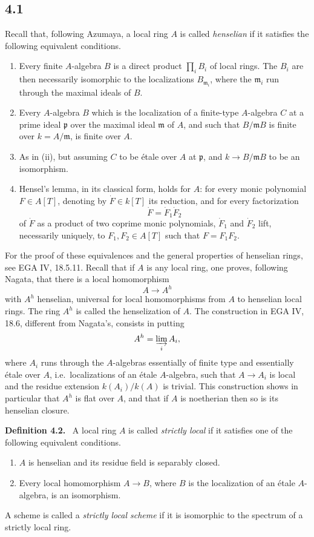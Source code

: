 \documentclass[11pt]{article}
\newcommand{\ie}{i.e.\ }
\newcommand{\EGA}{EGA}
\newenvironment{statement}[1]{\par\medskip\noindent\textbf{#1.}\ }{\par\medskip}
\begin{document}
\subsection*{4.1}
Recall that, following Azumaya, a local ring \(A\) is called \emph{henselian} if it satisfies the following equivalent conditions.
\begin{enumerate}[label=(\roman*)]
\item Every finite \(A\)-algebra \(B\) is a direct product \(\prod_i B_i\) of local rings. The \(B_i\) are then necessarily isomorphic to the localizations \(B_{\mathfrak m_i}\), where the \(\mathfrak m_i\) run through the maximal ideals of \(B\).
\item Every \(A\)-algebra \(B\) which is the localization of a finite-type \(A\)-algebra \(C\) at a prime ideal \(\mathfrak p\) over the maximal ideal \(\mathfrak m\) of \(A\), and such that \(B/\mathfrak mB\) is finite over \(k=A/\mathfrak m\), is finite over \(A\).
\item As in (ii), but assuming \(C\) to be \'etale over \(A\) at \(\mathfrak p\), and \(k\to B/\mathfrak mB\) to be an isomorphism.
\item Hensel's lemma, in its classical form, holds for \(A\): for every monic polynomial \(F\in A[T]\), denoting by \(\dot F\in k[T]\) its reduction, and for every factorization
\[
\dot F=\dot F_1\dot F_2
\]
of \(\dot F\) as a product of two coprime monic polynomials, \(\dot F_1\) and \(\dot F_2\) lift, necessarily uniquely, to \(F_1,F_2\in A[T]\) such that \(F=F_1F_2\).
\end{enumerate}
For the proof of these equivalences and the general properties of henselian rings, see \EGA{} IV, 18.5.11. Recall that if \(A\) is any local ring, one proves, following Nagata, that there is a local homomorphism
\[
A\longrightarrow A^h
\]
with \(A^h\) henselian, universal for local homomorphisms from \(A\) to henselian local rings. The ring \(A^h\) is called the henselization of \(A\). The construction in \EGA{} IV, 18.6, different from Nagata's, consists in putting
\[
A^h=\varinjlim_i A_i,
\]
where \(A_i\) runs through the \(A\)-algebras essentially of finite type and essentially \'etale over \(A\), \ie localizations of an \'etale \(A\)-algebra, such that \(A\to A_i\) is local and the residue extension \(k(A_i)/k(A)\) is trivial. This construction shows in particular that \(A^h\) is flat over \(A\), and that if \(A\) is noetherian then so is its henselian closure.

\begin{statement}{Definition 4.2}
A local ring \(A\) is called \emph{strictly local} if it satisfies one of the following equivalent conditions.
\begin{enumerate}[label=(\roman*)]
\item \(A\) is henselian and its residue field is separably closed.
\item Every local homomorphism \(A\to B\), where \(B\) is the localization of an \'etale \(A\)-algebra, is an isomorphism.
\end{enumerate}
A scheme is called a \emph{strictly local scheme} if it is isomorphic to the spectrum of a strictly local ring.
\end{statement}
\end{document}
